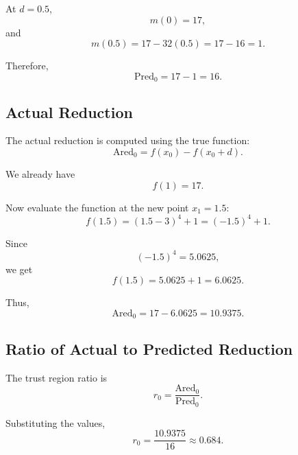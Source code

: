 \documentclass{article}
\begin{document}
At $d=0.5$,
\begin{equation}
m(0) = 17,
\end{equation}
and
\begin{equation}
m(0.5) = 17 - 32(0.5) = 17 - 16 = 1.
\end{equation}

Therefore,
\begin{equation}
\mathrm{Pred}_0 = 17 - 1 = 16.
\end{equation}

\subsection{Actual Reduction}

The actual reduction is computed using the true function:
\begin{equation}
\mathrm{Ared}_0 = f(x_0) - f(x_0+d).
\end{equation}

We already have
\begin{equation}
f(1)=17.
\end{equation}

Now evaluate the function at the new point $x_1=1.5$:
\begin{equation}
f(1.5) = (1.5-3)^4 + 1 = (-1.5)^4 + 1.
\end{equation}

Since
\begin{equation}
(-1.5)^4 = 5.0625,
\end{equation}
we get
\begin{equation}
f(1.5) = 5.0625 + 1 = 6.0625.
\end{equation}

Thus,
\begin{equation}
\mathrm{Ared}_0 = 17 - 6.0625 = 10.9375.
\end{equation}

\subsection{Ratio of Actual to Predicted Reduction}

The trust region ratio is
\begin{equation}
r_0 = \frac{\mathrm{Ared}_0}{\mathrm{Pred}_0}.
\end{equation}

Substituting the values,
\begin{equation}
r_0 = \frac{10.9375}{16} \approx 0.684.
\end{equation}
\end{document}
